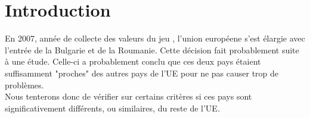 \section{Introduction}
En 2007, année de collecte des valeurs du jeu \jeuc, l'union européene s'est élargie avec l'entrée de la Bulgarie et de la Roumanie. Cette décision fait probablement suite à une étude. Celle-ci a probablement conclu que ces deux pays étaient suffisamment "proches" des autres pays de l'UE pour ne pas causer trop de problèmes.\\
Nous tenterons donc de vérifier sur certains critères si ces pays sont significativement différents, ou similaires, du reste de l'UE.

 